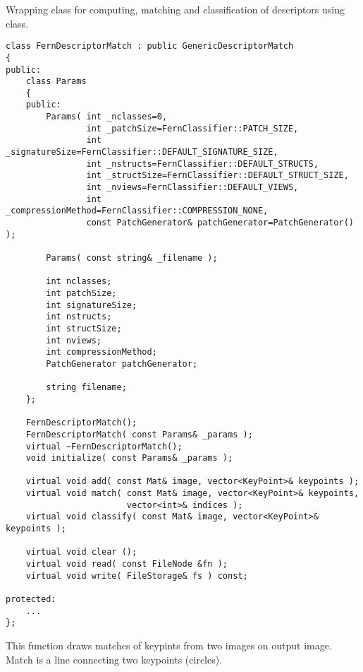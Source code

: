 Wrapping class for computing, matching and classification of descriptors using  class.

\begin{lstlisting}
class FernDescriptorMatch : public GenericDescriptorMatch
{
public:
    class Params
    {
    public:
        Params( int _nclasses=0,
                int _patchSize=FernClassifier::PATCH_SIZE,
                int _signatureSize=FernClassifier::DEFAULT_SIGNATURE_SIZE,
                int _nstructs=FernClassifier::DEFAULT_STRUCTS,
                int _structSize=FernClassifier::DEFAULT_STRUCT_SIZE,
                int _nviews=FernClassifier::DEFAULT_VIEWS,
                int _compressionMethod=FernClassifier::COMPRESSION_NONE,
                const PatchGenerator& patchGenerator=PatchGenerator() );

        Params( const string& _filename );

        int nclasses;
        int patchSize;
        int signatureSize;
        int nstructs;
        int structSize;
        int nviews;
        int compressionMethod;
        PatchGenerator patchGenerator;

        string filename;
    };

    FernDescriptorMatch();
    FernDescriptorMatch( const Params& _params );
    virtual ~FernDescriptorMatch();
    void initialize( const Params& _params );

    virtual void add( const Mat& image, vector<KeyPoint>& keypoints );
    virtual void match( const Mat& image, vector<KeyPoint>& keypoints, 
                        vector<int>& indices );
    virtual void classify( const Mat& image, vector<KeyPoint>& keypoints );

    virtual void clear ();
    virtual void read( const FileNode &fn );
    virtual void write( FileStorage& fs ) const;
    
protected:
	...
};
\end{lstlisting}

This function draws matches of keypints from two images on output image. 
Match is a line connecting two keypoints (circles).


